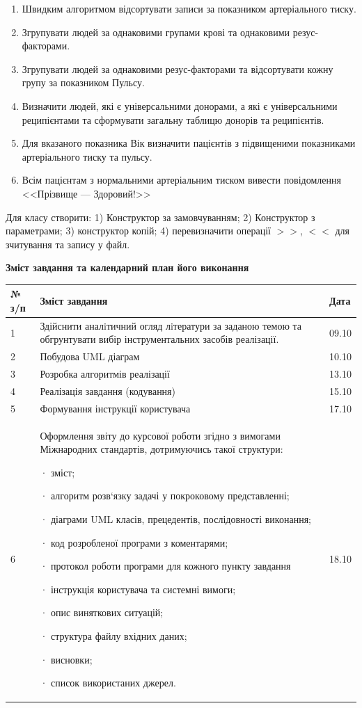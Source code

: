 \documentclass[oneside,14pt]{extarticle}
\begin{document}
\begin{enumerate}
	\item Швидким алгоритмом відсортувати записи за показником артеріального
	тиску.
	\item Згрупувати людей за однаковими групами крові та однаковими резус-
	факторами.
	\item Згрупувати людей за однаковими резус-факторами та відсортувати кожну
	групу за показником Пульсу.
	\item Визначити людей, які є універсальними донорами, а які є універсальними
	реципієнтами та сформувати загальну таблицю донорів та реципієнтів.
	\item Для вказаного показника Вік визначити пацієнтів з підвищеними показниками
	артеріального тиску та пульсу.
	\item Всім пацієнтам з нормальними артеріальним тиском вивести повідомлення
	<<Прізвище --- Здоровий!>>
\end{enumerate}
Для класу створити: 1) Конструктор за замовчуванням; 2) Конструктор з
параметрами; 3) конструктор копій; 4) перевизначити операції $>>$, $<<$ для
зчитування та запису у файл.
\newpage
\begin{center}
	\textbf{Зміст завдання та календарний план його виконання}
	
	\begin{tabular}{ | m{0.7cm} | m{14cm}| m{1.1cm} | }
		\hline
		№ з/п & Зміст завдання & Дата \\ 
		\hline
		1 & Здійснити аналiтичний огляд лiтератури за заданою темою та обгрунтувати вибір інструментальних засобів реалізації. & 09.10 \\
		\hline
		2 & Побудова UML діаграм & 10.10 \\
		\hline
		3 & Розробка алгоритмів реалізації & 13.10 \\
		\hline
		4 & Реалізація завдання (кодування) & 15.10 \\
		\hline
		5 & Формування інструкції користувача & 17.10 \\
		\hline
		6 & Оформлення звіту до курсової роботи згідно з вимогами Міжнародних стандартів, дотримуючись такої структури:
		
		·       зміст;
		
		·       алгоритм розв‘язку задачі у покроковому представленні;
		
		·       діаграми UML класів, прецедентів, послідовності виконання;
		
		·       код розробленої програми з коментарями;
		
		·       протокол роботи програми для кожного пункту завдання
		
		·       інструкція користувача та системні вимоги;
		
		·       опис виняткових ситуацій;
		
		·       структура файлу вхідних даних;
		
		·       висновки;
		
		·       список використаних джерел. & 18.10 \\
		\hline
	\end{tabular}
\end{center}
\end{document}
